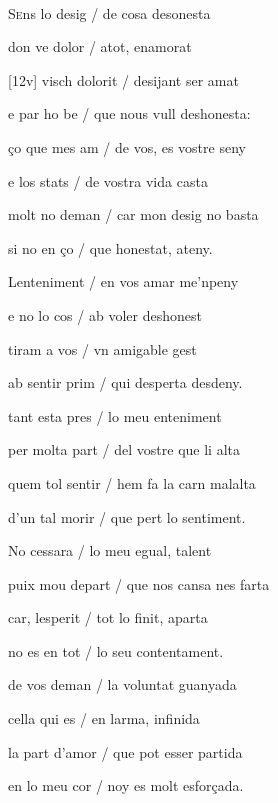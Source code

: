 \documentclass[12pt]{article}
\renewcommand{\espaiAbansEtiquetaPoema}{\vspace{0ex}}
\begin{document}
\begin{estrofa}

\espaiAbansEtiquetaPoema

\\

\end{estrofa}


\begin{estrofa}

 S\textsc{e}ns lo desig / de cosa desonesta

 don ve dolor / atot, enamorat

 [12v] visch dolorit / desijant ser amat

 e par ho be / que nous vull deshonesta:

 \c{c}o que mes am / de vos, es vostre seny

 e los stats / de vostra vida casta

 molt no deman / car mon desig no basta

 si no en \c{c}o / que honestat, ateny.

\end{estrofa}



\begin{estrofa}

 Lenteniment / en vos amar me'npeny

 e no lo cos / ab voler deshonest

 tiram a vos / vn amigable gest

 ab sentir prim / qui desperta desdeny.

 tant esta pres / lo meu enteniment

 per molta part / del vostre que li alta

 quem tol sentir / hem fa la carn malalta

 d'un tal morir / que pert lo sentiment.

\end{estrofa}



\begin{estrofa}

 No cessara / lo meu egual, talent

 puix mou depart / que nos cansa nes farta

 car, lesperit / tot lo finit, aparta

 no es en tot / lo seu contentament.

 de vos deman / la voluntat guanyada

 cella qui es / en larma, infinida

 la part d'amor / que pot esser partida

 en lo meu cor / noy es molt esfor\c{c}ada.

\end{estrofa}
\end{document}
